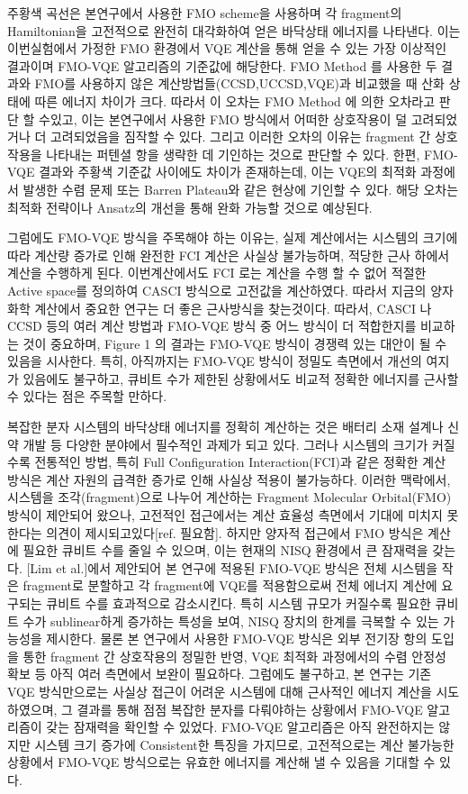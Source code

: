 \documentclass[pdflatex,sn-mathphys-num]{sn-jnl}%
\theoremstyle{thmstyleone}%
\theoremstyle{thmstyletwo}%
\theoremstyle{thmstylethree}%
\begin{document}
주황색 곡선은 본연구에서 사용한 FMO scheme을 사용하며 각 fragment의 Hamiltonian을 고전적으로 완전히 대각화하여 얻은 바닥상태 에너지를 나타낸다. 이는 이번실험에서 가정한 FMO 환경에서 VQE 계산을 통해 얻을 수 있는 가장 이상적인 결과이며 FMO-VQE 알고리즘의 기준값에 해당한다. FMO Method 를 사용한 두 결과와 FMO를 사용하지 않은 계산방법들(CCSD,UCCSD,VQE)과 비교했을 때 산화 상태에 따른 에너지 차이가 크다. 따라서 이 오차는 FMO Method 에 의한 오차라고 판단 할 수있고, 이는 본연구에서 사용한 FMO 방식에서 어떠한 상호작용이 덜 고려되었거나 더 고려되었음을 짐작할 수 있다. 그리고 이러한 오차의 이유는 fragment 간 상호작용을 나타내는 퍼텐셜 항을 생략한 데 기인하는 것으로 판단할 수 있다. 한편, FMO-VQE 결과와 주황색 기준값 사이에도 차이가 존재하는데, 이는 VQE의 최적화 과정에서 발생한 수렴 문제 또는 Barren Plateau와 같은 현상에 기인할 수 있다. 해당 오차는 최적화 전략이나 Ansatz의 개선을 통해 완화 가능할 것으로 예상된다.

그럼에도 FMO-VQE 방식을 주목해야 하는 이유는, 실제 계산에서는 시스템의 크기에 따라 계산량 증가로 인해 완전한 FCI 계산은 사실상 불가능하며, 적당한 근사 하에서 계산을 수행하게 된다. 이번계산에서도 FCI 로는 계산을 수행 할 수 없어 적절한 Active space를 정의하여 CASCI 방식으로 고전값을 계산하였다. 
따라서 지금의 양자화학 계산에서 중요한 연구는 더 좋은 근사방식을 찾는것이다. 따라서, CASCI 나 CCSD 등의 여러 계산 방법과 FMO-VQE 방식 중 어느 방식이 더 적합한지를 비교하는 것이 중요하며, Figure 1 의 결과는 FMO-VQE 방식이 경쟁력 있는 대안이 될 수 있음을 시사한다. 특히, 아직까지는 FMO-VQE 방식이 정밀도 측면에서 개선의 여지가 있음에도 불구하고, 큐비트 수가 제한된 상황에서도 비교적 정확한 에너지를 근사할 수 있다는 점은 주목할 만하다.

복잡한 분자 시스템의 바닥상태 에너지를 정확히 계산하는 것은 배터리 소재 설계나 신약 개발 등 다양한 분야에서 필수적인 과제가 되고 있다. 
그러나 시스템의 크기가 커질수록 전통적인 방법, 특히 Full Configuration Interaction(FCI)과 같은 정확한 계산 방식은 계산 자원의 급격한 증가로 인해 사실상 적용이 불가능하다.
이러한 맥락에서, 시스템을 조각(fragment)으로 나누어 계산하는 Fragment Molecular Orbital(FMO) 방식이 제안되어 왔으나, 고전적인 접근에서는 계산 효율성 측면에서 기대에 미치지 못한다는 의견이 제시되고있다[ref. 필요함]. 
하지만 양자적 접근에서 FMO 방식은 계산에 필요한 큐비트 수를 줄일 수 있으며, 이는 현재의 NISQ 환경에서 큰 잠재력을 갖는다. [Lim et al.]에서 제안되어 본 연구에 적용된 FMO-VQE 방식은 전체 시스템을 작은 fragment로 분할하고 각 fragment에 VQE를 적용함으로써 전체 에너지 계산에 요구되는 큐비트 수를 효과적으로 감소시킨다. 특히 시스템 규모가 커질수록 필요한 큐비트 수가 sublinear하게 증가하는 특성을 보여, NISQ 장치의 한계를 극복할 수 있는 가능성을 제시한다.
물론 본 연구에서 사용한 FMO-VQE 방식은 외부 전기장 항의 도입을 통한 fragment 간 상호작용의 정밀한 반영, VQE 최적화 과정에서의 수렴 안정성 확보 등 아직 여러 측면에서 보완이 필요하다. 그럼에도 불구하고, 본 연구는 기존 VQE 방식만으로는 사실상 접근이 어려운 시스템에 대해 근사적인 에너지 계산을 시도하였으며, 그 결과를 통해 점점 복잡한 분자를 다뤄야하는 상황에서 FMO-VQE 알고리즘이 갖는 잠재력을 확인할 수 있었다. FMO-VQE 알고리즘은 아직 완전하지는 않지만 시스템 크기 증가에 Consistent한 특징을 가지므로, 고전적으로는 계산 불가능한 상황에서 FMO-VQE 방식으로는 유효한 에너지를 계산해 낼 수 있음을 기대할 수 있다. 
\end{document}
